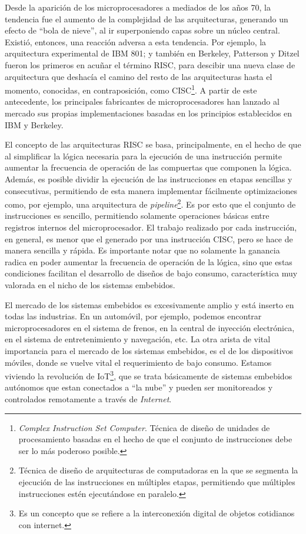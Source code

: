 \documentclass[a4paper]{article}
\begin{document}
Desde la aparición de los microprocesadores a mediados de los años 70, la tendencia fue el aumento de la complejidad de las arquitecturas, generando un efecto de ``bola de nieve'', al ir superponiendo capas sobre un núcleo central. Existió, entonces, una reacción adversa a esta tendencia. Por ejemplo, la arquitectura experimental de IBM 801; y también en Berkeley, Patterson y Ditzel fueron los primeros en acuñar el término RISC, para descibir una nueva clase de arquitectura que deshacía el camino del resto de las arquitecturas hasta el momento, conocidas, en contraposición, como CISC\footnote{\label{CISC} \emph{Complex Instruction Set Computer}. Técnica de diseño de unidades de procesamiento basadas en el hecho de que el conjunto de instrucciones debe ser lo más poderoso posible.}. A partir de este antecedente, los principales fabricantes de microprocesadores han lanzado al mercado sus propias implementaciones basadas en los principios establecidos en IBM y Berkeley.

El concepto de las arquitecturas RISC se basa, principalmente, en el hecho de que al simplificar la lógica necesaria para la ejecución de una instrucción permite aumentar la frecuencia de operación de las compuertas que componen la lógica. Además, es posible dividir la ejecución de las instrucciones en etapas sencillas y consecutivas, permitiendo de esta manera implementar fácilmente optimizaciones como, por ejemplo, una arquitectura de \emph{pipeline}\footnote{\label{Pipeline} Técnica de diseño de arquitecturas de computadoras en la que se segmenta la ejecución de las instrucciones en múltiples etapas, permitiendo que múltiples instrucciones estén ejecutándose en paralelo.}. Es por esto que el conjunto de instrucciones es sencillo, permitiendo solamente operaciones básicas entre registros internos del microprocesador. El trabajo realizado por cada instrucción, en general, es menor que el generado por una instrucción CISC, pero se hace de manera sencilla y rápida. Es importante notar que no solamente la ganancia radica en poder aumentar la frecuencia de operación de la lógica, sino que estas condiciones facilitan el desarrollo de diseños de bajo consumo, característica muy valorada en el nicho de los sistemas embebidos.

El mercado de los sistemas embebidos es excesivamente amplio y está inserto en todas las industrias. En un automóvil, por ejemplo, podemos encontrar microprocesadores en el sistema de frenos, en la central de inyección electrónica, en el sistema de entretenimiento y navegación, etc. La otra arista de vital importancia para el mercado de los sistemas embebidos, es el de los dispositivos móviles, donde se vuelve vital el requerimiento de bajo consumo. Estamos viviendo la revolución de IoT\footnote{\label{Internet of Things} Es un concepto que se refiere a la interconexión digital de objetos cotidianos con internet.}, que se trata básicamente de sistemas embebidos autónomos que estan conectados a ``la nube'' y pueden ser monitoreados y controlados remotamente a través de \emph{Internet}.
\end{document}

